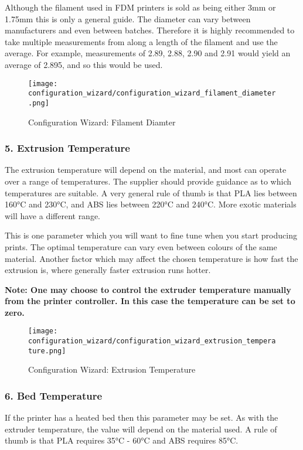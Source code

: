 Although the filament used in FDM printers is sold as being either 3mm or 1.75mm this is only a general guide.  The diameter can vary between manufacturers and even between batches.  Therefore it is highly recommended to take multiple measurements from along a length of the filament and use the average.  For example, measurements of 2.89, 2.88, 2.90 and 2.91 would yield an average of 2.895, and so this would be used.

\begin{figure}[H]
\centering
\texttt{[image: configuration\_wizard/configuration\_wizard\_filament\_diameter.png]}
\caption{Configuration Wizard: Filament Diamter}
\label{fig:configuration_wizard_filament_diameter}
\end{figure}

\newpage
\subsubsection{5. Extrusion Temperature}
\label{sub:5_extrusion_temperature}
The extrusion temperature will depend on the material, and most can operate over a range of temperatures.  The supplier should provide guidance as to which temperatures are suitable.  A very general rule of thumb is that PLA lies between 160°C and 230°C, and ABS lies between 220°C and 240°C. More exotic materials will have a different range.

This is one parameter which you will want to fine tune when you start producing prints.  The optimal temperature can vary even between colours of the same material.  Another factor which may affect the chosen temperature is how fast the extrusion is, where generally faster extrusion runs hotter.

\textbf{Note: One may choose to control the extruder temperature manually from the printer controller. In this case the temperature can be set to zero.}

\begin{figure}[H]
\centering
\texttt{[image: configuration\_wizard/configuration\_wizard\_extrusion\_temperature.png]}
\caption{Configuration Wizard: Extrusion Temperature}
\label{fig:configuration_wizard_extrusion_temperature}
\end{figure}

\newpage
\subsubsection{6. Bed Temperature}
\label{sub:6_bed_temperature}
If the printer has a heated bed then this parameter may be set.  As with the extruder temperature, the value will depend on the material used.  A rule of thumb is that PLA requires 35°C - 60°C and ABS requires 85°C.

